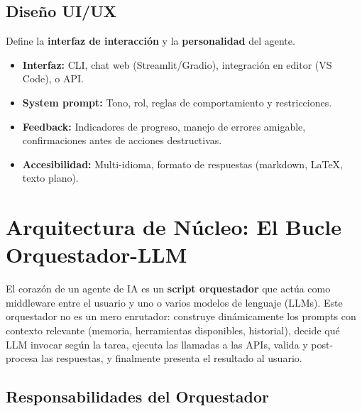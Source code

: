 \documentclass[12pt,a4paper]{article}
\begin{document}
\subsection{Diseño UI/UX}

Define la \textbf{interfaz de interacción} y la \textbf{personalidad} del agente.

\begin{itemize}[leftmargin=*]
  \item \textbf{Interfaz:} CLI, chat web (Streamlit/Gradio), integración en editor (VS Code), o API.
  \item \textbf{System prompt:} Tono, rol, reglas de comportamiento y restricciones.
  \item \textbf{Feedback:} Indicadores de progreso, manejo de errores amigable, confirmaciones antes de acciones destructivas.
  \item \textbf{Accesibilidad:} Multi-idioma, formato de respuestas (markdown, LaTeX, texto plano).
\end{itemize}

\section{Arquitectura de Núcleo: El Bucle Orquestador-LLM}

El corazón de un agente de IA es un \textbf{script orquestador} que actúa como middleware entre el usuario y uno o varios modelos de lenguaje (LLMs). Este orquestador no es un mero enrutador: construye dinámicamente los prompts con contexto relevante (memoria, herramientas disponibles, historial), decide qué LLM invocar según la tarea, ejecuta las llamadas a las APIs, valida y post-procesa las respuestas, y finalmente presenta el resultado al usuario.

\begin{center}
\end{center}

\subsection{Responsabilidades del Orquestador}
\end{document}
